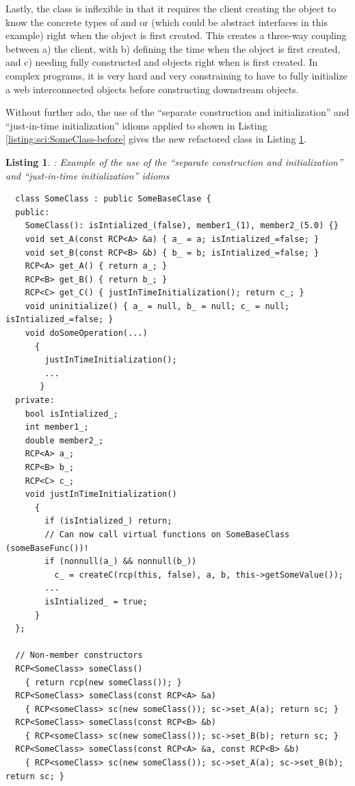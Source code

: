 \documentclass[pdf,ps2pdf,11pt]{SANDreport}
\newtheorem{listing}{Listing}
\begin{document}
Lastly, the class {} is inflexible in that it requires the
client creating the {} object to know the concrete types of
{} and or {} (which could be abstract interfaces in this
example) right when the {} object is first created.  This
creates a three-way coupling between a) the client, with b) defining the time
when the {} object is first created, and c) needing fully
constructed {} and {} objects right when {} is
first created.  In complex programs, it is very hard and very constraining to
have to fully initialize a web interconnected objects before constructing
downstream objects.

Without further ado, the use of the ``separate construction and
initialization'' and ``just-in-time initialization'' idioms applied to
{} shown in Listing {}\ref{listing:sci:SomeClass-before} gives
the new refactored class in Listing {}\ref{listing:sci:SomeClass-refactored}.


\begin{listing}: Example of the use of the ``separate construction and
initialization'' and ``just-in-time initialization'' idioms  \\
\label{listing:sci:SomeClass-refactored}
{\small\begin{verbatim}
  class SomeClass : public SomeBaseClase {
  public:
    SomeClass(): isIntialized_(false), member1_(1), member2_(5.0) {}
    void set_A(const RCP<A> &a) { a_ = a; isIntialized_=false; }
    void set_B(const RCP<B> &b) { b_ = b; isIntialized_=false; }
    RCP<A> get_A() { return a_; }
    RCP<B> get_B() { return b_; }
    RCP<C> get_C() { justInTimeInitialization(); return c_; }
    void uninitialize() { a_ = null, b_ = null; c_ = null; isIntialized_=false; }
    void doSomeOperation(...)
      {
        justInTimeInitialization();
        ...
       }
  private:
    bool isIntialized_;
    int member1_;
    double member2_;
    RCP<A> a_;
    RCP<B> b_;
    RCP<C> c_;
    void justInTimeInitialization()
      {
        if (isIntialized_) return;
        // Can now call virtual functions on SomeBaseClass (someBaseFunc())!
        if (nonnull(a_) && nonnull(b_))
          c_ = createC(rcp(this, false), a, b, this->getSomeValue());
        ...
        isIntialized_ = true;
      }
  };

  // Non-member constructors
  RCP<SomeClass> someClass()
    { return rcp(new someClass()); }
  RCP<SomeClass> someClass(const RCP<A> &a)
    { RCP<someClass> sc(new someClass()); sc->set_A(a); return sc; }
  RCP<SomeClass> someClass(const RCP<B> &b)
    { RCP<someClass> sc(new someClass()); sc->set_B(b); return sc; }
  RCP<SomeClass> someClass(const RCP<A> &a, const RCP<B> &b)
    { RCP<someClass> sc(new someClass()); sc->set_A(a); sc->set_B(b);  return sc; }
\end{verbatim}}
\end{listing}
\end{document}
